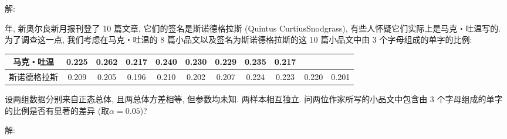 \documentclass[standard]{ExBook}
\begin{document}
\begin{qitems}
\vspace{-5em}

    \begin{bbox}
解: 
    \end{bbox}

\vspace{-5em}

    \begin{bbox}
    \begin{shaded}
         年, 新奥尔良新月报刊登了 10 篇文章, 它们的签名是斯诺德格拉斯 (Quintus CurtiusSnodgrass), 有些人怀疑它们实际上是马克・吐温写的. 为了调查这一点, 我们考虑在马克・吐温的 8 篇小品文以及签名为斯诺德格拉斯的这 10 篇小品文中由 3 个字母组成的单字的比例:
\begin{center}
\setlength{\tabcolsep}{6.5pt}
\begin{tabular}{c|cccccccccc}
\hline
马克・吐温 & 0.225 & 0.262 & 0.217 & 0.240 & 0.230 & 0.229 & 0.235 & 0.217 &  &  \\
\hline
斯诺德格拉斯 & 0.209 & 0.205 & 0.196 & 0.210 & 0.202 & 0.207 & 0.224 & 0.223 & 0.220 & 0.201 \\
\hline
\end{tabular}
\end{center}
设两组数据分别来自正态总体, 且两总体方差相等, 但参数均未知. 两样本相互独立. 问两位作家所写的小品文中包含由 3 个字母组成的单字的比例是否有显著的差异 (取$\alpha=0.05$)?
    \end{shaded}
    \end{bbox}

\vspace{-5em}

    \begin{bbox}
解: 
    \end{bbox}

\vspace{-5em}


\end{qitems}
\end{document}
